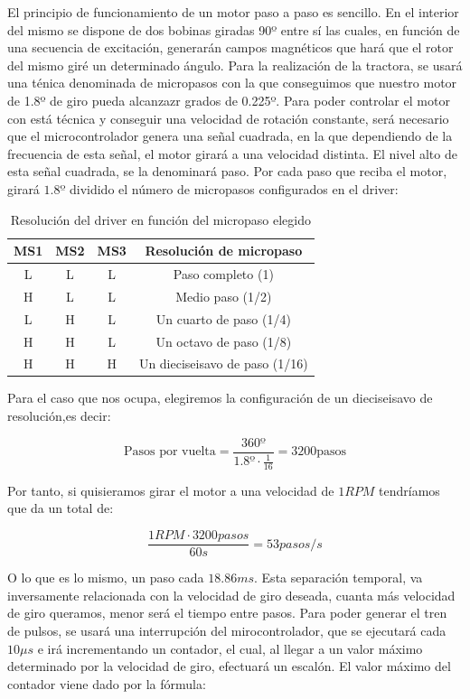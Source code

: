 El principio de funcionamiento de un motor paso a paso es sencillo. En el interior del mismo se dispone de dos bobinas giradas 90º entre sí \cite{pasoapaso} las cuales, en función de una secuencia de excitación, generarán campos magnéticos que hará que el rotor del mismo giré un determinado ángulo. Para la realización de la tractora, se usará una ténica denominada de micropasos con la que conseguimos que nuestro motor de 1.8º de giro pueda alcanzazr grados de 0.225º. Para poder controlar el motor con está técnica y conseguir una velocidad de rotación constante, será necesario que el microcontrolador genera una señal cuadrada, en la que dependiendo de la frecuencia de esta señal, el motor girará a una velocidad distinta. El nivel alto de esta señal cuadrada, se la denominará paso. Por cada paso que reciba el motor, girará $1.8º$ dividido el número de micropasos configurados en el driver:

\begin{table}[H]
\centering
\begin{tabular}{cccc}
{\bf MS1} & {\bf MS2} & {\bf MS3} & {\bf Resolución de micropaso}  \\
\hline
L         & L         & L         & Paso completo (1)              \\
H         & L         & L         & Medio paso (1/2)               \\
L         & H         & L         & Un cuarto de paso (1/4)        \\
H         & H         & L         & Un octavo de paso (1/8)        \\
H         & H         & H         & Un dieciseisavo de paso (1/16)
\end{tabular}
\caption{Resolución del driver en función del micropaso elegido}
\label{tab:res_drive}
\end{table}

Para el caso que nos ocupa, elegiremos la configuración de un dieciseisavo de resolución,es decir:

$$ \text{Pasos por vuelta} = \frac{360º}{1.8º \cdot \frac{1}{16} } = 3200 \text{pasos}  $$

Por tanto, si quisieramos girar el motor a una velocidad de $1RPM$ tendríamos que da un total de:

$$\frac{1 RPM \cdot 3200 pasos}{60 s} = 53 pasos/s$$

O lo que es lo mismo, un paso cada $18.86 ms$. Esta separación temporal, va inversamente relacionada con la velocidad de giro deseada, cuanta más velocidad de giro queramos, menor será el tiempo entre pasos. Para poder generar el tren de pulsos, se usará una interrupción del mirocontrolador, que se ejecutará cada $10\mu s$ e irá incrementando un contador, el cual, al llegar a un valor máximo determinado por la velocidad de giro, efectuará un escalón. El valor máximo del contador viene dado por la fórmula:

